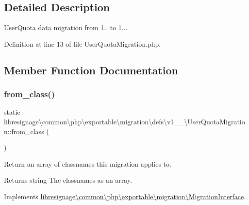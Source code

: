 \subsection{Detailed Description}
User\+Quota data migration from 1.. to 1... 

Definition at line 13 of file User\+Quota\+Migration.\+php.



\subsection{Member Function Documentation}
\mbox{\label{classlibresignage_1_1common_1_1php_1_1exportable_1_1migration_1_1defs_1_1v1__0__0_1_1UserQuotaMigration_ac6dac99f910ea3433abf47f0b6a641e3}} 
\subsubsection{\texorpdfstring{from\+\_\+class()}{from\_class()}}
{\footnotesize\ttfamily static libresignage\textbackslash{}common\textbackslash{}php\textbackslash{}exportable\textbackslash{}migration\textbackslash{}defs\textbackslash{}v1\+\_\+\_\textbackslash{}\+User\+Quota\+Migration\+::from\+\_\+class (\begin{DoxyParamCaption}{ }\end{DoxyParamCaption})\hspace{0.3cm}{\ttfamily [static]}}

Return an array of classnames this migration applies to.

\begin{DoxyReturn}{Returns}
string The classnames as an array. 
\end{DoxyReturn}


Implements \hyperlink{interfacelibresignage_1_1common_1_1php_1_1exportable_1_1migration_1_1MigrationInterface_aa8eb2e4ff59358ae551061687540f724}{libresignage\textbackslash{}common\textbackslash{}php\textbackslash{}exportable\textbackslash{}migration\textbackslash{}\+Migration\+Interface}.



